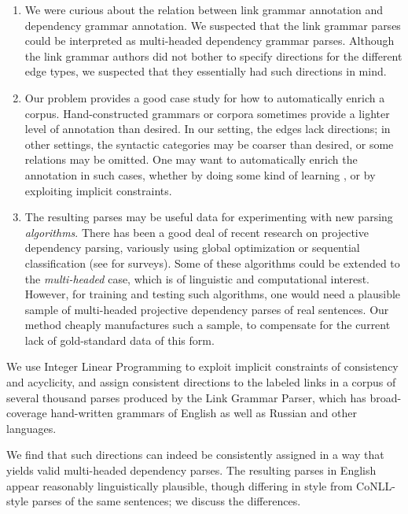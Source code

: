 \documentclass[11pt]{article}
\begin{document}
\begin{enumerate}

\item We were curious about the relation between link grammar annotation and dependency grammar annotation.  We suspected that the link grammar parses could be interpreted as multi-headed dependency grammar parses.  Although the link grammar authors did not bother to specify directions for the different edge types, we suspected that they essentially had such directions in mind.  

\item Our problem provides a good case study for how to automatically enrich a corpus.  Hand-constructed grammars or corpora sometimes provide a lighter level of annotation than desired.  In our setting, the edges lack directions; in other settings, the syntactic categories may be coarser than desired, or some relations may be omitted.  One may want to automatically enrich the annotation in such cases, whether by doing some kind of learning \cite[et seq.]{matsuzaki-et-al-2005}, or by exploiting implicit constraints.  

\item The resulting parses may be useful data for experimenting with new parsing {\em algorithms}.  There has been a good deal of recent research on projective dependency parsing, variously using global optimization or sequential classification (see \cite{martins-et-al-2008,bohnet-2011,chen-li-zhang-2014} for surveys). Some of these algorithms could be extended to the {\em multi-headed} case, which is of linguistic and computational interest.  However, for training and testing such algorithms, one would need a plausible sample of multi-headed projective dependency parses of real sentences.  Our method cheaply manufactures such a sample, to compensate for the current lack of gold-standard data of this form.

\end{enumerate}


We use Integer Linear Programming to exploit implicit constraints of consistency and acyclicity, and assign consistent directions to the labeled links in a corpus of several thousand parses produced by the Link Grammar Parser, which has broad-coverage hand-written grammars of English as well as Russian and other languages.  

We find that such directions can indeed be consistently assigned in a way that yields valid multi-headed dependency parses. The resulting parses in English appear reasonably linguistically plausible, though differing in style from CoNLL-style parses of the same sentences; we discuss the differences.  
\end{document}
